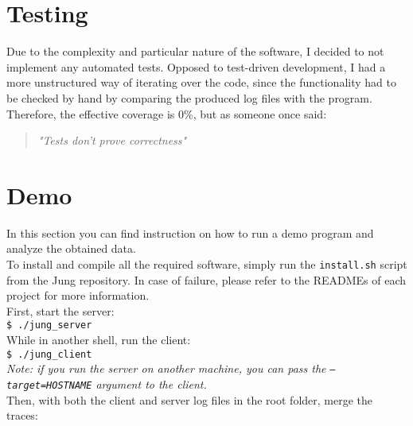     \section{Testing}

        Due to the complexity and particular nature of the software, I decided to not implement any automated
        tests. Opposed to test-driven development, I had a more unstructured way of iterating over the code,
        since the functionality had to be checked by hand by comparing the produced log files with the program.
        Therefore, the effective coverage is 0\%, but as someone once said:\\

        \begin{quote} 
            \centering 
            \textit{"Tests don't prove correctness"}
        \end{quote}


    \section{Demo}

        In this section you can find instruction on how to run a demo program and analyze the obtained data.\\

        To install and compile all the required software, simply run the \texttt{install.sh} script from the Jung repository.
        In case of failure, please refer to the READMEs of each project for more information.\\

        First, start the server:\\

        \texttt{\$ ./jung\_server}\\
        
        While in another shell, run the client:\\
        
        \texttt{\$ ./jung\_client}\\

        \textit{Note: if you run the server on another machine, you can pass the \texttt{---target=HOSTNAME}
        argument to the client.}\\

        Then, with both the client and server log files in the root folder, merge the traces:\\

